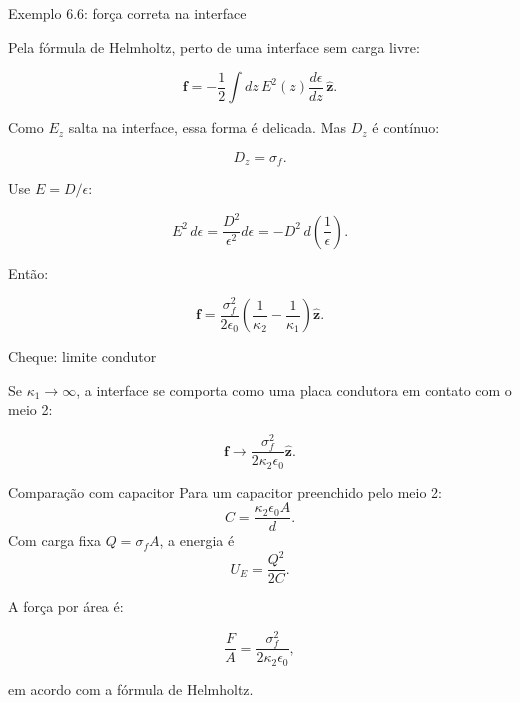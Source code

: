 \documentclass[aspectratio=169]{beamer}
\begin{document}
\begin{frame}{Exemplo 6.6: força correta na interface}

\small

Pela fórmula de Helmholtz, perto de uma interface sem carga livre:

\[
\mathbf f
=
-\frac12\int dz\,E^2(z)\frac{d\epsilon}{dz}\,\hat{\mathbf z}.
\]

Como \(E_z\) salta na interface, essa forma é delicada. Mas \(D_z\) é contínuo:

\[
D_z=\sigma_f.
\]

Use \(E=D/\epsilon\):

\[
E^2\,d\epsilon
=
\frac{D^2}{\epsilon^2}d\epsilon
=
-D^2\,d\left(\frac{1}{\epsilon}\right).
\]

Então:

\begin{eqbox}
\begin{equation}
\mathbf f
=
\frac{\sigma_f^2}{2\epsilon_0}
\left(
\frac{1}{\kappa_2}
-
\frac{1}{\kappa_1}
\right)\hat{\mathbf z}.
\end{equation}
\end{eqbox}

\end{frame}

\begin{frame}{Cheque: limite condutor}

\footnotesize

Se \(\kappa_1\to\infty\), a interface se comporta como uma placa condutora em
contato com o meio 2:

\[
\mathbf f
\to
\frac{\sigma_f^2}{2\kappa_2\epsilon_0}\hat{\mathbf z}.
\]

\begin{mybox}{Comparação com capacitor}
Para um capacitor preenchido pelo meio 2:
\[
C=\frac{\kappa_2\epsilon_0 A}{d}.
\]
Com carga fixa \(Q=\sigma_f A\), a energia é
\[
U_E=\frac{Q^2}{2C}.
\]
\end{mybox}

A força por área é:

\[
\frac{F}{A}
=
\frac{\sigma_f^2}{2\kappa_2\epsilon_0},
\]

em acordo com a fórmula de Helmholtz.

\end{frame}
\end{document}
